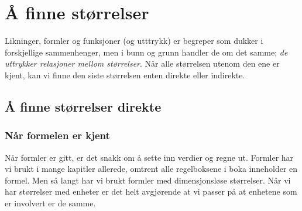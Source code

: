 



\section{Å finne størrelser}
Likninger, formler og funksjoner (og utttrykk) er begreper som dukker i forskjellige sammenhenger, men i bunn og grunn handler de om det samme; \textsl{de uttrykker relasjoner mellom størrelser}. Når alle størrelsen utenom den ene er kjent, kan vi finne den siste størrelsen enten direkte eller indirekte.\vsk


\subsection{Å finne størrelser direkte}
\subsubsection{Når formelen er kjent}
Når formler er gitt, er det snakk om å sette inn verdier og regne ut. Formler har vi brukt i mange kapitler allerede, omtrent alle regelboksene i boka inneholder en formel. 
Men så langt har vi brukt formler med dimensjonsløse størrelser. Når vi har størrelser med enheter er det helt avgjørende at vi passer på at enhetene som er involvert er de samme.

\regv

